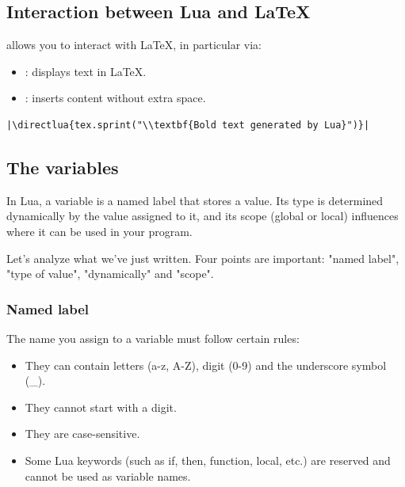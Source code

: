 \subsection{Interaction between Lua and LaTeX}

\tkzEngine{\LUALATEX} allows you to interact with LaTeX, in particular via:

\begin{itemize}
\item {}: displays text in LaTeX.
\item {}: inserts content without extra space.\\
\end{itemize}

\begin{mybox}
\begin{verbatim}
|\directlua{tex.sprint("\\textbf{Bold text generated by Lua}")}|
\end{verbatim}
\end{mybox}


\subsection{The variables}

\begin{mybox}
  In Lua, a variable is a named label that stores a value. Its type is determined dynamically by the value assigned to it, and its scope (global or local) influences where it can be used in your program.
\end{mybox}

Let's analyze what we've just written. Four points are important: "named label", "type of value", "dynamically" and "scope".


\subsubsection{Named label}

The name you assign to a variable must follow certain rules:

\begin{itemize}
  \item They can contain letters (a-z, A-Z), digit (0-9) and the underscore symbol (\_).
  \item They cannot start with a digit.
  \item They are case-sensitive.
  \item Some Lua keywords (such as if, then, function, local, etc.) are reserved and cannot be used as variable names.
\end{itemize}

